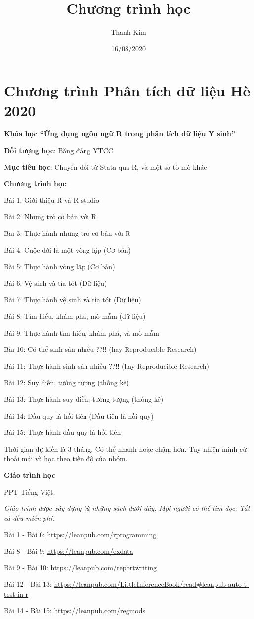 \documentclass[
]{article}
\title{Chương trình học}
\author{Thanh Kim}
\date{16/08/2020}
\begin{document}
\maketitle

\hypertarget{chux1b0ux1a1ng-truxecnh-phuxe2n-tuxedch-dux1eef-liux1ec7u-huxe8-2020}{%
\section{Chương trình Phân tích dữ liệu Hè
2020}\label{chux1b0ux1a1ng-truxecnh-phuxe2n-tuxedch-dux1eef-liux1ec7u-huxe8-2020}}

\textbf{Khóa học ``Ứng dụng ngôn ngữ R trong phân tích dữ liệu Y sinh''}

\textbf{Đối tượng học}: Băng đảng YTCC

\textbf{Mục tiêu học}: Chuyển đổi từ Stata qua R, và một số tò mò khác

\textbf{Chương trình học}:

Bài 1: Giới thiệu R và R studio

Bài 2: Những trò cơ bản với R

Bài 3: Thực hành những trò cơ bản với R

Bài 4: Cuộc đời là một vòng lặp (Cơ bản)

Bài 5: Thực hành vòng lặp (Cơ bản)

Bài 6: Vệ sinh và tỉa tót (Dữ liệu)

Bài 7: Thực hành vệ sinh và tỉa tót (Dữ liệu)

Bài 8: Tìm hiểu, khám phá, mò mẫm (dữ liệu)

Bài 9: Thực hành tìm hiểu, khám phá, và mò mẫm

Bài 10: Có thể sinh sản nhiều ??!! (hay Reproducible Research)

Bài 11: Thực hành sinh sản nhiều ??!! (hay Reproducible Research)

Bài 12: Suy diễn, tưởng tượng (thống kê)

Bài 13: Thực hành suy diễn, tưởng tượng (thống kê)

Bài 14: Đầu quy là hồi tiên (Đầu tiên là hồi quy)

Bài 15: Thực hành đầu quy là hồi tiên

Thời gian dự kiến là 3 tháng. Có thể nhanh hoặc chậm hơn. Tuy nhiên mình
cứ thoải mái và học theo tiến độ của nhóm.

\textbf{Giáo trình học}

PPT Tiếng Việt.

\emph{Giáo trình được xây dựng từ những sách dưới đây. Mọi người có thể
tìm đọc. Tất cả đều miễn phí.}

Bài 1 - Bài 6: \url{https://leanpub.com/rprogramming}

Bài 8 - Bài 9: \url{https://leanpub.com/exdata}

Bài 9 - Bài 10: \url{https://leanpub.com/reportwriting}

Bài 12 - Bài 13:
\url{https://leanpub.com/LittleInferenceBook/read\#leanpub-auto-t-test-in-r}

Bài 14 - Bài 15: \url{https://leanpub.com/regmods}
\end{document}
